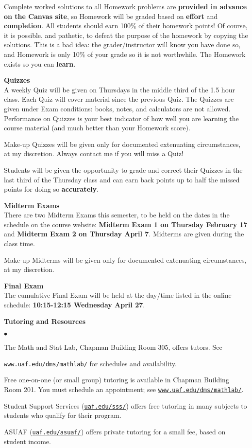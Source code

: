 \documentclass[12pt]{article}
\renewcommand{\emph}[1]{\textsf{\textbf{#1}}}
\newcommand{\localhead}[1]{\par\smallskip\textbf{#1} \smallskip\nobreak\\}%
\def\heading#1{\localhead{\large\emph{#1}}}
\newenvironment{clist}%
{\bgroup\parskip 0pt\begin{list}{$\bullet$}{\partopsep 4pt\topsep 0pt\itemsep -2pt}}%
{\end{list}\egroup}%
\begin{document}
Complete worked solutions to all Homework problems are \emph{provided in advance on the Canvas site}, so Homework will be graded based on \emph{effort} and \emph{completion}.  All students should earn 100\% of their homework points!  Of course, it is possible, and pathetic, to defeat the purpose of the homework by copying the solutions.  This is a bad idea: the grader/instructor will know you have done so, and Homework is only 10\% of your grade so it is not worthwhile.  The Homework exists so you can \emph{learn}.


\heading{Quizzes}
A weekly Quiz will be given on Thursdays in the middle third of the 1.5 hour class.  Each Quiz will cover material since the previous Quiz.  The Quizzes are given under Exam conditions: books, notes, and calculators are not allowed.  Performance on Quizzes is your best indicator of how well you are learning the course material (and much better than your Homework score).

Make-up Quizzes will be given only for documented extenuating circumstances, at my discretion.  Always contact me if you will miss a Quiz!

Students will be given the opportunity to grade and correct their Quizzes in the last third of the Thursday class and can earn back points up to half the missed points for doing so \emph{accurately}.


\heading{Midterm Exams}
There are two Midterm Exams this semester, to be held on the dates in the schedule on the course website: \emph{Midterm Exam 1 on Thursday February 17} and \emph{Midterm Exam 2 on Thursday April 7}.  Midterms are given during the class time.

Make-up Midterms will be given only for documented extenuating circumstances, at my discretion.


\heading{Final Exam} 
The cumulative Final Exam will be held at the day/time listed in the online schedule: \textbf{10:15-12:15 Wednesday April 27}.


\heading{Tutoring and Resources}
\vskip -30pt\strut
\begin{clist}
	\item The Math and Stat Lab, Chapman Building Room 305, offers tutors. 
	See 

	\href{http://www.uaf.edu/dms/mathlab/}{\texttt{www.uaf.edu/dms/mathlab/}} for schedules and availability.
	\item Free
one-on-one (or small group) tutoring is available in 
Chapman Building Room 201. You must schedule an
appointment; see \href{http://www.uaf.edu/dms/mathlab/}{\texttt{www.uaf.edu/dms/mathlab/}}.
	\item Student Support Services (\href{https://uaf.edu/sss/}{\texttt{uaf.edu/sss/}}) offers free tutoring in many subjects to students who qualify for their program.
	\item ASUAF (\href{https://uaf.edu/asuaf/}{\texttt{uaf.edu/asuaf/}}) offers private tutoring for a small fee, based on student income.
\end{clist}
\end{document}
